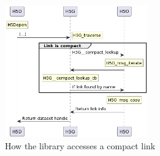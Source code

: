 \begin{figure}
\centering
\includegraphics[width=0.55\textwidth]{images/tour_4_uml_link_access_compact.png}
\caption{How the library accesses a compact link}
\label{fig:tour-4-uml-link-access-compact}
\end{figure}

